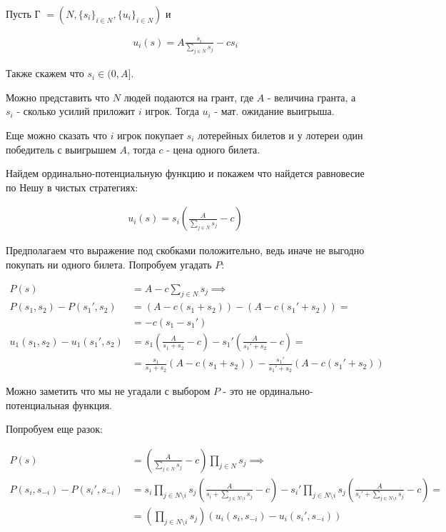 \begin{exmpl}

	Пусть Г $= (N, \{s_i\}_{i \in N}, \{u_i\}_{i \in N})$ и

	\begin{align*}
		u_i(s) = A \frac{s_i}{\sum_{j \in N} s_j} - c s_i
	\end{align*}

	Также скажем что $s_i \in (0, A]$.

	Можно представить что $N$ людей подаются на грант, где  $A$ - величина гранта, а  $s_i$ - сколько усилий приложит  $i$ игрок.
	Тогда  $u_i$ - мат. ожидание выигрыша.

	Еще можно сказать что  $i$ игрок покупает  $s_i$ лотерейных билетов и у лотереи один победитель с выигрышем  $A$, тогда  $c$ - цена одного билета. 

	Найдем ординально-потенциальную функцию и покажем что найдется равновесие по Нешу в чистых стратегиях:

	\begin{align*}
		u_i(s) = s_i\left(\frac{A}{\sum_{j \in N} s_j} - c\right)
	\end{align*}

	Предполагаем что выражение под скобками положительно, ведь иначе не выгодно покупать ни одного билета. Попробуем угадать $P$:  

	\begin{align*}
		P(s) &= A - c \sum_{j \in N} s_j \implies \\
		P(s_1, s_2) - P(s_1', s_2) &= (A - c(s_1 + s_2)) - (A - c(s_1' + s_2)) = \\
								   &= -c(s_1 - s_1') \\
		u_1(s_1, s_2) - u_1(s_1', s_2) &= s_1 \left(\frac{A}{s_1 + s_2} - c\right) - s_1'\left(\frac{A}{s_1' + s_2} - c\right) = \\
									   &= \frac{s_1}{s_1 + s_2}(A - c(s_1 + s_2)) - \frac{s_1'}{s_1' + s_2}(A - c(s_1' + s_2))
	\end{align*}

	Можно заметить что мы не угадали с выбором $P$ - это не ординально-потенциальная функция.

	Попробуем еще разок:

	\begin{align*}
		P(s) &= \left(\frac{A}{\sum_{j \in N} s_j} - c\right) \prod_{j \in N} s_j \implies  \\
		P(s_{i}, s_{-i}) - P(s_i', s_{-i}) &= s_i \prod_{j \in N \setminus i } s_j \left(\frac{A}{s_i + \sum_{j \in N \setminus i} s_j} - c\right) - s_i' \prod_{j \in N \setminus i} s_j \left(\frac{A}{s_i' + \sum_{j \in N \setminus i} s_j} - c\right) = \\
						   &= \left(\prod_{j \in N \setminus i} s_j\right) \left( u_i(s_i, s_{-i}) - u_i(s_i', s_{-i}) \right) 
	\end{align*}


\end{exmpl}
